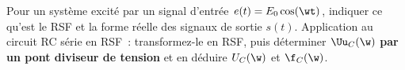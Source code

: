 \documentclass[a4paper, 10pt, final, garamond]{book}
\begin{document}
\begin{enumerate}[label=\sqenumi]
\begin{isd}[]
{\[			\]
		}
		\tcblower
		\begin{center}
		\end{center}
		\wsw{
			\[
				\Uu = \Zu\ind{para}\Iu\ind{para} = \Zu_1\Iu_1
				\Lra
				\boxed{
					\Iu_k = \frac{\Zu\ind{para}}{\Zu_k}\Iu\ind{para}
				}
			\]
		}
	\end{isd}
	\begin{minipage}[t]{.65\linewidth}
		Pour un système excité par un signal d'entrée $e(t) = E_0\cos(\wt)$,
		indiquer ce qu'est le RSF et la forme réelle des signaux de sortie $s(t)$.
		Application au circuit RC série en RSF~: transformez-le en RSF, puis
		déterminer $\Uu_C(\w)$ \textbf{par un pont diviseur de tension} et en
		déduire $U_C(\w)$ et $\f_C(\w)$.
	\end{minipage}
	\hfill
	\begin{minipage}[t]{.30\linewidth}
		\vspace{-12pt}
		\begin{center}
\end{center}
\end{minipage}
\end{enumerate}
\end{document}
